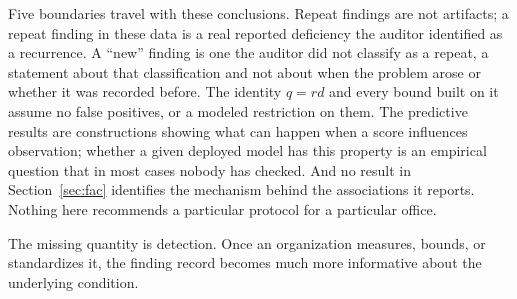 Five boundaries travel with these conclusions. Repeat findings are not
artifacts; a repeat finding in these data is a real reported deficiency the
auditor identified as a recurrence. A ``new'' finding is one the auditor did
not classify as a repeat, a statement about that classification and not about
when the problem arose or whether it was recorded before. The identity $q =
rd$ and every bound built on it assume no false positives, or a modeled
restriction on them. The predictive results are
constructions showing what can happen when a score influences observation;
whether a given deployed model has this property is an empirical question
that in most cases nobody has checked. And no result in Section~\ref{sec:fac}
identifies the mechanism behind the associations it reports. Nothing here
recommends a particular protocol for a particular office.

The missing quantity is detection. Once an organization measures, bounds, or
standardizes it, the finding record becomes much more informative about the
underlying condition.
